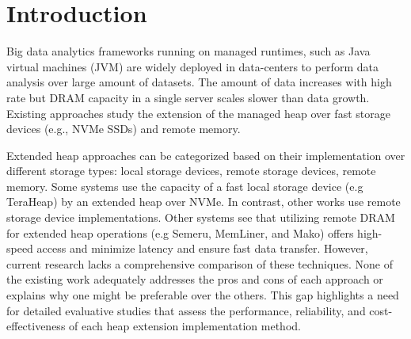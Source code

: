 \section{Introduction}

Big data analytics frameworks running on managed runtimes, such as Java virtual
machines (JVM) are widely deployed in data-centers to perform data analysis over
large amount of datasets. The amount of data increases with high rate but DRAM
capacity in a single server scales slower than data growth. Existing approaches
study the extension of the managed heap over fast storage devices (e.g., NVMe
SSDs) and remote memory.

\par Extended heap approaches can be categorized based on their implementation over
different storage types: local storage devices, remote storage devices, remote memory. Some systems use the capacity of a fast local storage device (e.g TeraHeap) by an extended heap over NVMe. In contrast, other works use remote storage device
implementations. Other systems see that utilizing remote DRAM for
extended heap operations (e.g Semeru, MemLiner, and Mako) offers high-speed
access and minimize latency and ensure fast data transfer. However, current research lacks a comprehensive comparison of these
techniques. None of the existing work adequately addresses the pros and cons of
each approach or explains why one might be preferable over the others. This gap
highlights a need for detailed evaluative studies that assess the performance,
reliability, and cost-effectiveness of each heap extension implementation
method.





